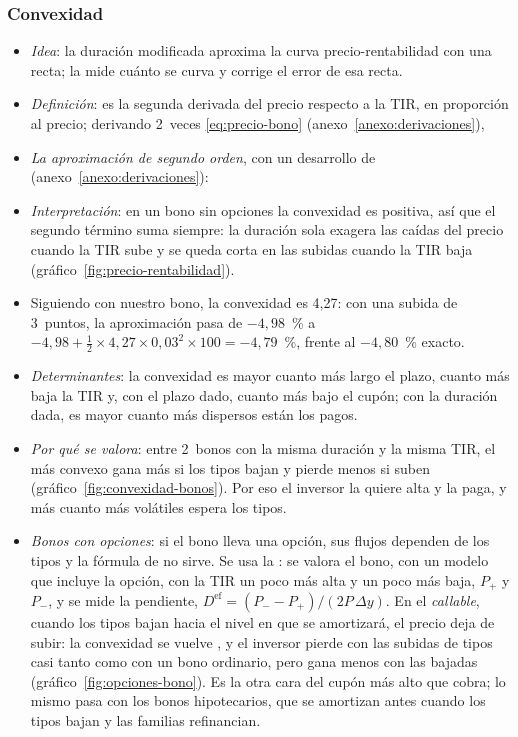 \documentclass[11pt]{article}
\begin{document}
\subsubsection{Convexidad}\label{sec:convexidad}

\begin{itemize}
\item \emph{Idea}: la duración modificada aproxima la curva precio-rentabilidad con una recta; la  mide cuánto se curva y corrige el error de esa recta.
\item \emph{Definición}: es la segunda derivada del precio respecto a la TIR, en proporción al precio; derivando 2~veces \eqref{eq:precio-bono} (anexo~\ref{anexo:derivaciones}),
\item \emph{La aproximación de segundo orden}, con un desarrollo de  (anexo~\ref{anexo:derivaciones}):
\item \emph{Interpretación}: en un bono sin opciones la convexidad es positiva, así que el segundo término suma siempre: la duración sola exagera las caídas del precio cuando la TIR sube y se queda corta en las subidas cuando la TIR baja (gráfico~\ref{fig:precio-rentabilidad}).
\item Siguiendo con nuestro bono, la convexidad es 4,27: con una subida de 3~puntos, la aproximación pasa de $-4{,}98$~\% a $-4{,}98+\tfrac12\times4{,}27\times0{,}03^2\times100=-4{,}79$~\%, frente al $-4{,}80$~\% exacto.
\item \emph{Determinantes}: la convexidad es mayor cuanto más largo el plazo, cuanto más baja la TIR y, con el plazo dado, cuanto más bajo el cupón; con la duración dada, es mayor cuanto más dispersos están los pagos.
\item \emph{Por qué se valora}: entre 2~bonos con la misma duración y la misma TIR, el más convexo gana más si los tipos bajan y pierde menos si suben (gráfico~\ref{fig:convexidad-bonos}). Por eso el inversor la quiere alta y la paga, y más cuanto más volátiles espera los tipos.
\item \emph{Bonos con opciones}: si el bono lleva una opción, sus flujos dependen de los tipos y la fórmula de  no sirve. Se usa la : se valora el bono, con un modelo que incluye la opción, con la TIR un poco más alta y un poco más baja, $P_+$ y $P_-$, y se mide la pendiente, $D^{\mathrm{ef}}=(P_--P_+)/(2P\,\Delta y)$\nocite{Fabozzi2021Bond}. En el \emph{callable}, cuando los tipos bajan hacia el nivel en que se amortizará, el precio deja de subir: la convexidad se vuelve , y el inversor pierde con las subidas de tipos casi tanto como con un bono ordinario, pero gana menos con las bajadas (gráfico~\ref{fig:opciones-bono}). Es la otra cara del cupón más alto que cobra; lo mismo pasa con los bonos hipotecarios, que se amortizan antes cuando los tipos bajan y las familias refinancian.
\end{itemize}
\end{document}
